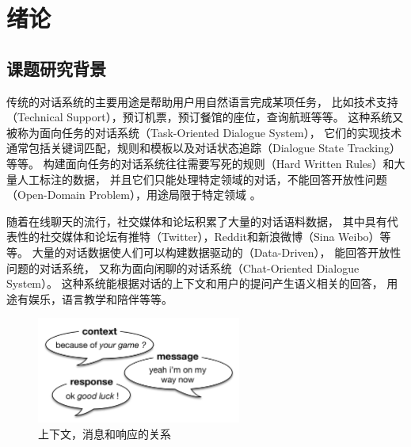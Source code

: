 % 
% 
% 
% 

\chapter{绪论}\label{ch:introduction}

\section{课题研究背景}\label{sec:research_background}
传统的对话系统的主要用途是帮助用户用自然语言完成某项任务，
比如技术支持（Technical Support），预订机票，预订餐馆的座位，查询航班等等。
这种系统又被称为面向任务的对话系统（Task-Oriented Dialogue System），
它们的实现技术通常包括关键词匹配，规则和模板以及对话状态追踪（Dialogue State Tracking）等等。
构建面向任务的对话系统往往需要写死的规则（Hard Written Rules）和大量人工标注的数据，
并且它们只能处理特定领域的对话，不能回答开放性问题（Open-Domain Problem），用途局限于特定领域
。

随着在线聊天的流行，社交媒体和论坛积累了大量的对话语料数据，
其中具有代表性的社交媒体和论坛有推特（Twitter），Reddit和新浪微博（Sina Weibo）等等。
大量的对话数据使人们可以构建数据驱动的（Data-Driven），
能回答开放性问题的对话系统，
又称为面向闲聊的对话系统（Chat-Oriented Dialogue System）。
这种系统能根据对话的上下文和用户的提问产生语义相关的回答，
用途有娱乐，语言教学和陪伴等等。
\begin{figure}[H]
    \includegraphics[width=0.6\textwidth]{figure/context_message_response.png}
    \centering
    \caption{上下文，消息和响应的关系}
    \label{fig:context_message_response}
\end{figure}

